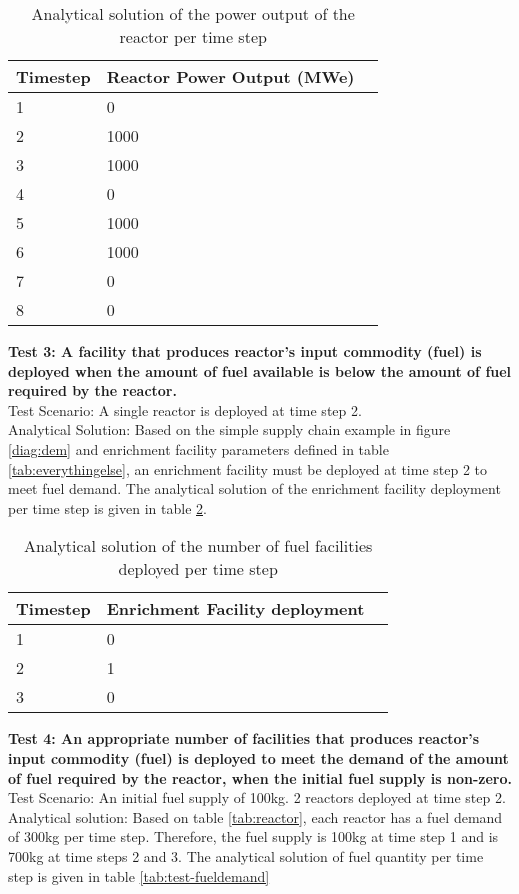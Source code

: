 \documentclass[12pt,letterpaper]{article}
\begin{document}
\begin{table}[H]
     \centering
    \begin{tabularx}{\textwidth}{bbb}
       \hline
       Timestep & Reactor Power Output (MWe) \\
       \hline
       1 & 0 \\
       2 & 1000 \\
       3 & 1000 \\
       4 & 0 \\
       5 & 1000 \\
       6 & 1000 \\
       7 & 0 \\
       8 & 0 \\
       \hline
    \end{tabularx}
    \caption {Analytical solution of the power output of the reactor per time step}
    \label{tab:test-cycles}
\end{table}

\noindent
\textbf{Test 3: A facility that produces reactor’s input commodity (fuel) is deployed when the amount of fuel available is below the amount of fuel required by the reactor.} \\
Test Scenario: A single reactor is deployed at time step 2.\\
Analytical Solution: Based on the simple supply chain example in figure \ref{diag:dem} and enrichment facility parameters defined in table \ref{tab:everythingelse}, an enrichment facility must be deployed at time step 2 to meet fuel demand. The analytical solution of the enrichment facility deployment per time step is given in table \ref{tab:test-fuel}.

\begin{table}[H]
     \centering
    \begin{tabularx}{\textwidth}{bbb}
       \hline
       Timestep & Enrichment Facility deployment  \\
       \hline
       1 & 0 \\
       2 & 1 \\
       3 & 0\\
       \hline
    \end{tabularx}
    \caption {Analytical solution of the number of fuel facilities deployed per time step}
    \label{tab:test-fuel}
\end{table}

\noindent
\textbf{Test 4: An appropriate number of facilities that produces reactor's input commodity (fuel) is deployed to meet the demand of the amount of fuel required by the reactor, when the initial fuel supply is non-zero.} \\
Test Scenario: An initial fuel supply of 100kg. 2 reactors deployed at time step 2. \\
Analytical solution: Based on table \ref{tab:reactor}, each reactor has a fuel demand of 300kg per time step. Therefore, the fuel supply is 100kg at time step 1 and is 700kg at time steps 2 and 3. The analytical solution of fuel quantity per time step is given in table \ref{tab:test-fueldemand}  
\end{document}
